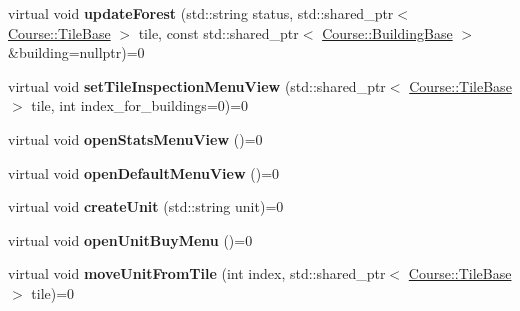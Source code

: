 \begin{DoxyCompactItemize}
\item 
\hypertarget{class_course_1_1i_game_event_handler_a701eba27730f7c2038e9e04b247936a1}{virtual void {\bfseries update\-Forest} (std\-::string status, std\-::shared\-\_\-ptr$<$ \hyperlink{class_course_1_1_tile_base}{Course\-::\-Tile\-Base} $>$ tile, const std\-::shared\-\_\-ptr$<$ \hyperlink{class_course_1_1_building_base}{Course\-::\-Building\-Base} $>$ \&building=nullptr)=0}\label{class_course_1_1i_game_event_handler_a701eba27730f7c2038e9e04b247936a1}

\item 
\hypertarget{class_course_1_1i_game_event_handler_a5e8ed00233a86377413ec9a74d3583a0}{virtual void {\bfseries set\-Tile\-Inspection\-Menu\-View} (std\-::shared\-\_\-ptr$<$ \hyperlink{class_course_1_1_tile_base}{Course\-::\-Tile\-Base} $>$ tile, int index\-\_\-for\-\_\-buildings=0)=0}\label{class_course_1_1i_game_event_handler_a5e8ed00233a86377413ec9a74d3583a0}

\item 
\hypertarget{class_course_1_1i_game_event_handler_abb9fa40c8f3529ea00e930d8480df610}{virtual void {\bfseries open\-Stats\-Menu\-View} ()=0}\label{class_course_1_1i_game_event_handler_abb9fa40c8f3529ea00e930d8480df610}

\item 
\hypertarget{class_course_1_1i_game_event_handler_acd565f49492e6714f4d7be125099681b}{virtual void {\bfseries open\-Default\-Menu\-View} ()=0}\label{class_course_1_1i_game_event_handler_acd565f49492e6714f4d7be125099681b}

\item 
\hypertarget{class_course_1_1i_game_event_handler_a8a4da8745776a663eaf2e0cc33a5f35f}{virtual void {\bfseries create\-Unit} (std\-::string unit)=0}\label{class_course_1_1i_game_event_handler_a8a4da8745776a663eaf2e0cc33a5f35f}

\item 
\hypertarget{class_course_1_1i_game_event_handler_af115943c7ff335505536c20c84f6ef62}{virtual void {\bfseries open\-Unit\-Buy\-Menu} ()=0}\label{class_course_1_1i_game_event_handler_af115943c7ff335505536c20c84f6ef62}

\item 
\hypertarget{class_course_1_1i_game_event_handler_af30e32fd07181ff435c1284f9a8de89a}{virtual void {\bfseries move\-Unit\-From\-Tile} (int index, std\-::shared\-\_\-ptr$<$ \hyperlink{class_course_1_1_tile_base}{Course\-::\-Tile\-Base} $>$ tile)=0}\label{class_course_1_1i_game_event_handler_af30e32fd07181ff435c1284f9a8de89a}


\end{DoxyCompactItemize}
